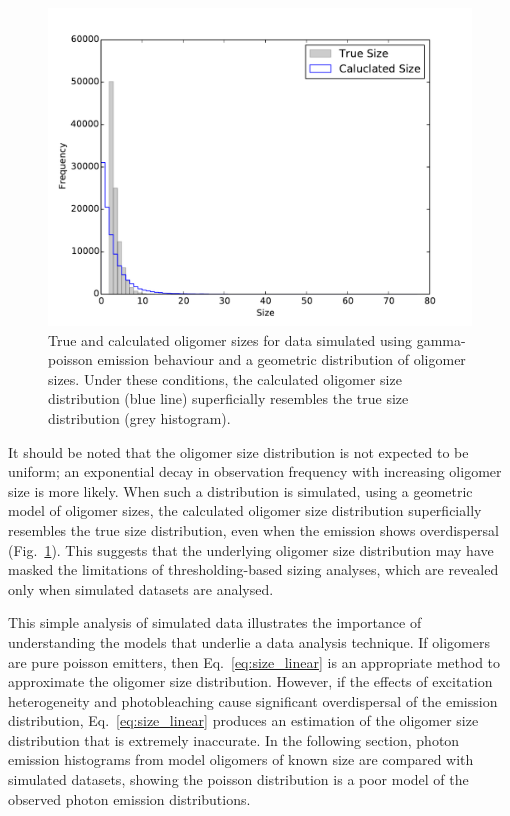 \begin{figure}
   \begin{center}
      \includegraphics*[clip=true, width=6in]{sizing/True_vs_Measured_oligomer_events_geometric_100000.pdf}
      \caption{True and calculated oligomer sizes for data simulated using gamma-poisson emission behaviour and a geometric distribution of oligomer sizes. Under these conditions, the calculated oligomer size distribution (blue line) superficially resembles the true size distribution (grey histogram).}
      \label{fig:gamma_poisson_size_photons_geometric}
   \end{center}
\end{figure}

It should be noted that the oligomer size distribution is not expected to be uniform; an exponential decay in observation frequency with increasing oligomer size is more likely. When such a distribution is simulated, using a geometric model of oligomer sizes, the calculated oligomer size distribution superficially resembles the true size distribution, even when the emission shows overdispersal (Fig.~\ref{fig:gamma_poisson_size_photons_geometric}). This suggests that the underlying oligomer size distribution may have masked the limitations of thresholding-based sizing analyses, which are revealed only when simulated datasets are analysed. 

This simple analysis of simulated data illustrates the importance of understanding the models that underlie a data analysis technique. If oligomers are pure poisson emitters, then Eq.~\ref{eq:size_linear} is an appropriate method to approximate the oligomer size distribution. However, if the effects of excitation heterogeneity and photobleaching cause significant overdispersal of the emission distribution, Eq.~\ref{eq:size_linear} produces an estimation of the oligomer size distribution that is extremely inaccurate. In the following section, photon emission histograms from model oligomers of known size are compared with simulated datasets, showing the poisson distribution is a poor model of the observed photon emission distributions. 

